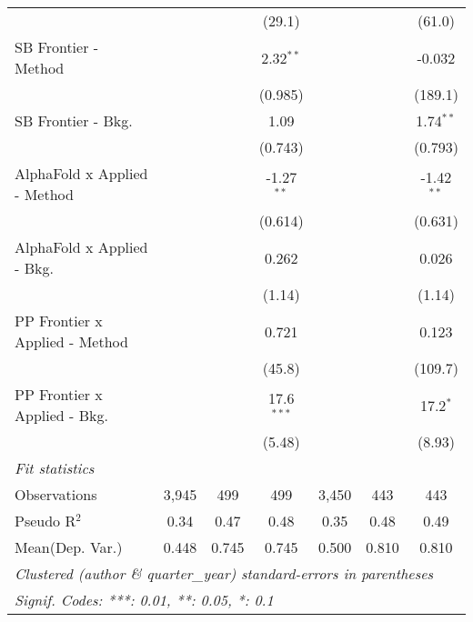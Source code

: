 \begin{tabular}{lcccccc}
                                  &                &               & (29.1)        &                &               & (61.0)\\   
   SB Frontier - Method           &                &               & 2.32$^{**}$   &                &               & -0.032\\   
                                  &                &               & (0.985)       &                &               & (189.1)\\   
   SB Frontier - Bkg.             &                &               & 1.09          &                &               & 1.74$^{**}$\\   
                                  &                &               & (0.743)       &                &               & (0.793)\\   
   AlphaFold x Applied - Method   &                &               & -1.27$^{**}$  &                &               & -1.42$^{**}$\\   
                                  &                &               & (0.614)       &                &               & (0.631)\\   
   AlphaFold x Applied - Bkg.     &                &               & 0.262         &                &               & 0.026\\   
                                  &                &               & (1.14)        &                &               & (1.14)\\   
   PP Frontier x Applied - Method &                &               & 0.721         &                &               & 0.123\\   
                                  &                &               & (45.8)        &                &               & (109.7)\\   
   PP Frontier x Applied - Bkg.   &                &               & 17.6$^{***}$  &                &               & 17.2$^{*}$\\   
                                  &                &               & (5.48)        &                &               & (8.93)\\   
   \midrule
   \emph{Fit statistics}\\
   Observations                   & 3,945          & 499           & 499           & 3,450          & 443           & 443\\  
   Pseudo R$^2$                   & 0.34           & 0.47          & 0.48          & 0.35           & 0.48          & 0.49\\  
Mean(Dep. Var.) & 0.448 & 0.745 & 0.745 & 0.500 & 0.810 & 0.810 \\
   \midrule \midrule
   \multicolumn{7}{l}{\emph{Clustered (author \& quarter\_year) standard-errors in parentheses}}\\
   \multicolumn{7}{l}{\emph{Signif. Codes: ***: 0.01, **: 0.05, *: 0.1}}\\
\end{tabular}
\par\endgroup
